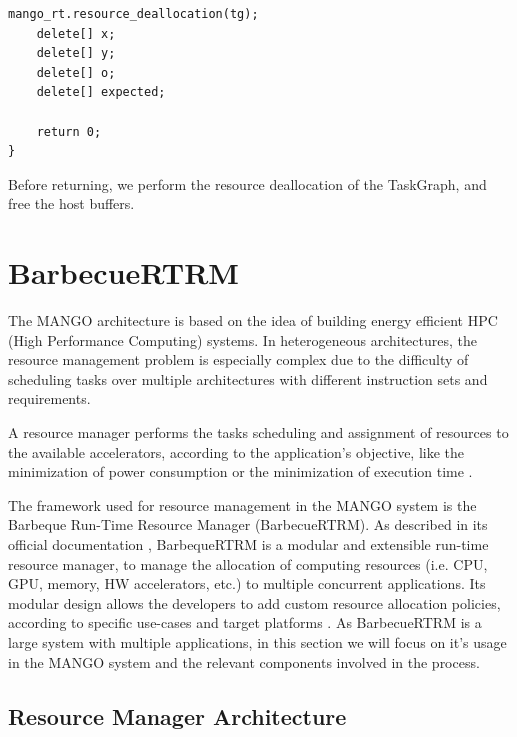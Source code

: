 \begin{lstlisting}[style=CStyle, caption=Sample - Teardown]
    mango_rt.resource_deallocation(tg);
    delete[] x;
    delete[] y;
    delete[] o;
    delete[] expected;

    return 0;
}
\end{lstlisting}

Before returning, we perform the resource deallocation of the TaskGraph, and free the host buffers.

\section{BarbecueRTRM}

The MANGO architecture is based on the idea of building energy efficient HPC (High Performance Computing) systems. In heterogeneous architectures, the resource management problem is especially complex due to the difficulty of scheduling tasks over multiple architectures with different instruction sets and requirements.

A resource manager performs the tasks scheduling and assignment of resources to the available accelerators, according to the application's objective, like the minimization of power consumption or the minimization of execution time \cite{mango_exploring_manycore_architectures}.

The framework used for resource management in the MANGO system is the Barbeque Run-Time Resource Manager (BarbecueRTRM). 
As described in its official documentation \cite{bosp}, BarbequeRTRM is a modular and extensible run-time resource manager, to manage the allocation of computing resources (i.e. CPU, GPU, memory, HW accelerators, etc.) to multiple concurrent applications. Its modular design allows the developers to add custom resource allocation policies, according to specific use-cases and target platforms \cite{barbecue_1}\cite{barbecue_2}. As BarbecueRTRM is a large system with multiple applications, in this section we will focus on it's usage in the MANGO system and the relevant components involved in the process.

\subsection{Resource Manager Architecture}

